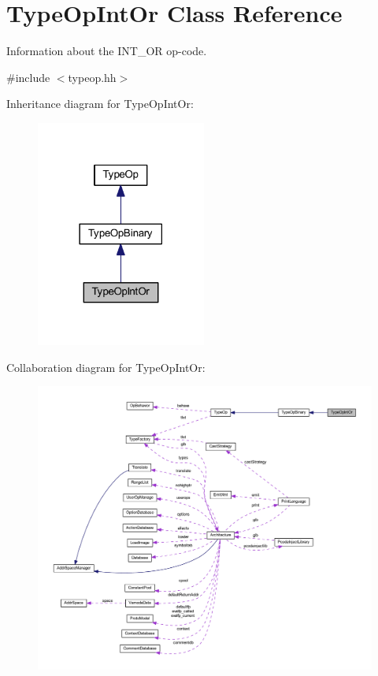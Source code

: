\hypertarget{class_type_op_int_or}{}\section{Type\+Op\+Int\+Or Class Reference}
\label{class_type_op_int_or}


Information about the I\+N\+T\+\_\+\+OR op-\/code.  




{\ttfamily \#include $<$typeop.\+hh$>$}



Inheritance diagram for Type\+Op\+Int\+Or\+:
\nopagebreak
\begin{figure}[H]
\begin{center}
\leavevmode
\includegraphics[width=158pt]{class_type_op_int_or__inherit__graph}
\end{center}
\end{figure}


Collaboration diagram for Type\+Op\+Int\+Or\+:
\nopagebreak
\begin{figure}[H]
\begin{center}
\leavevmode
\includegraphics[width=350pt]{class_type_op_int_or__coll__graph}
\end{center}
\end{figure}
